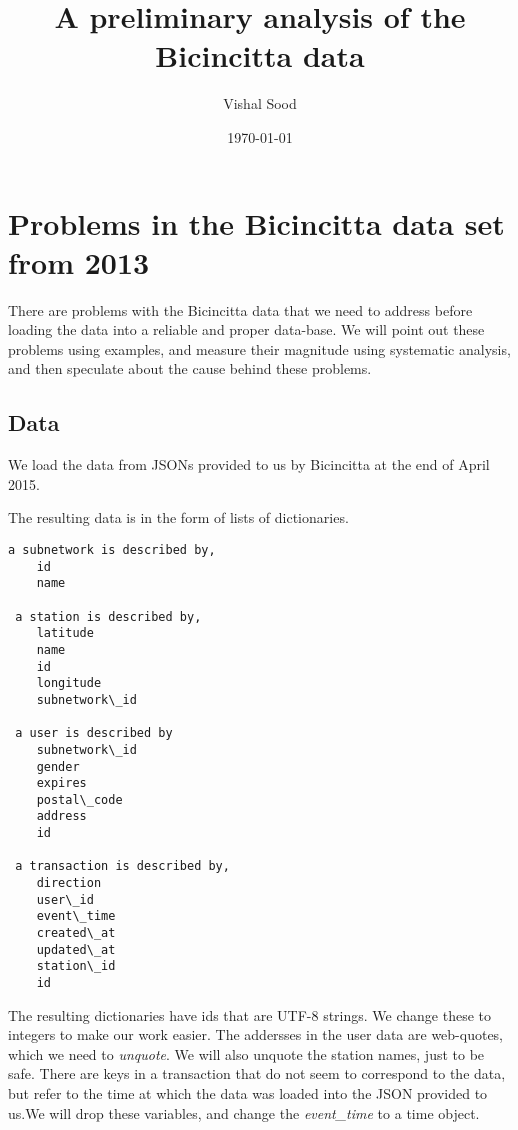\documentclass{report}
\title{A preliminary analysis of the Bicincitta data}
\author{Vishal Sood}
\affil{Citiviz S\'arl, Lausanne}
\date{\today}
\begin{document}
    
    
    
    \maketitle
    
    
    \tableofcontents


    
    \section{Problems in the Bicincitta data set from
2013}\label{problems-in-the-bicincitta-data-set-from-2013}

There are problems with the Bicincitta data that we need to address
before loading the data into a reliable and proper data-base. We will
point out these problems using examples, and measure their magnitude
using systematic analysis, and then speculate about the cause behind
these problems.

    \subsection{Data}\label{data}

We load the data from JSONs provided to us by Bicincitta at the end of
April 2015.


    The resulting data is in the form of lists of dictionaries.


    \begin{Verbatim}[commandchars=\\\{\}]
a subnetwork is described by, 
	id
	name

 a station is described by,
	latitude
	name
	id
	longitude
	subnetwork\_id

 a user is described by 
	subnetwork\_id
	gender
	expires
	postal\_code
	address
	id

 a transaction is described by, 
	direction
	user\_id
	event\_time
	created\_at
	updated\_at
	station\_id
	id
    \end{Verbatim}

    The resulting dictionaries have ids that are UTF-8 strings. We change
these to integers to make our work easier. The addersses in the user
data are web-quotes, which we need to \emph{unquote}. We will also
unquote the station names, just to be safe. There are keys in a
transaction that do not seem to correspond to the data, but refer to the
time at which the data was loaded into the JSON provided to us.We will
drop these variables, and change the \emph{event\_time} to a time
object.
\end{document}
